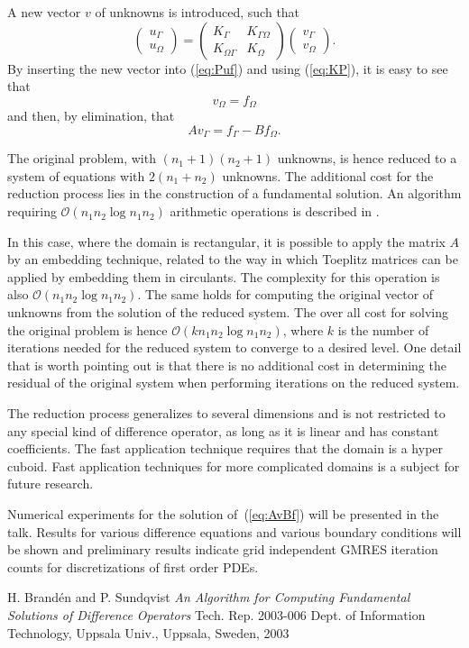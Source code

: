 \documentclass{report}
\begin{document}
A new vector $v$ of unknowns is introduced, such that
\[
\left(\begin{array}{c} u_{\Gamma}\\ u_{\Omega} \end{array}\right)
=\left( \begin{array}{cc} K_{\Gamma} & K_{\Gamma\Omega}\\
K_{\Omega\Gamma} & K_{\Omega} \end{array} \right)
\left( \begin{array}{c} v_{\Gamma}\\ v_{\Omega} \end{array} \right).
\]
By inserting the new vector into (\ref{eq:Puf}) and using
(\ref{eq:KP}), it is easy to see that
\[
v_{\Omega} = f_{\Omega}
\]
and then, by elimination, that
\begin{equation}
\label{eq:AvBf}
Av_{\Gamma} = f_{\Gamma}-Bf_{\Omega}.
\end{equation}

The original problem, with $(n_1+1)(n_2+1)$ unknowns, is hence reduced
to a system of equations with $2(n_1+n_2)$ unknowns. The additional
cost for the reduction process lies in the construction of a
fundamental solution. An algorithm requiring $\mathcal{O}(n_1n_2\log
n_1n_2)$ arithmetic operations is described in \cite{BrSu03}.

In this case, where the domain is rectangular, it is possible to apply
the matrix $A$ by an embedding technique, related to the way in which
Toeplitz matrices can be applied by embedding them in circulants. The
complexity for this operation is also $\mathcal{O}(n_1n_2\log
n_1n_2)$. The same holds for computing the original vector of
unknowns from the solution of the reduced system. The over all cost
for solving the original problem is hence $\mathcal{O}(k n_1n_2\log
n_1n_2)$, where $k$ is the number of iterations needed for the reduced
system to converge to a desired level. One detail that is worth
pointing out is that there is no additional cost in determining the
residual of the original system when performing iterations on the
reduced system.

The reduction process generalizes to several dimensions and is not
restricted to any special kind of difference operator, as long as it
is linear and has constant coefficients. The fast application
technique requires that the domain is a hyper cuboid. Fast application
techniques for more complicated domains is a subject for future
research.

Numerical experiments for the solution of~(\ref{eq:AvBf}) will be
presented in the talk. Results for various difference equations and
various boundary conditions will be shown and preliminary results
indicate grid independent GMRES iteration counts for discretizations
of first order PDEs.


\begin{thebibliography}{9}
 H. Brand\'en and P. Sundqvist \emph{An Algorithm for
Computing Fundamental Solutions of Difference Operators} Tech.
Rep. 2003-006 Dept. of Information Technology, Uppsala Univ.,
Uppsala, Sweden, 2003
\end{thebibliography}
\end{document}
